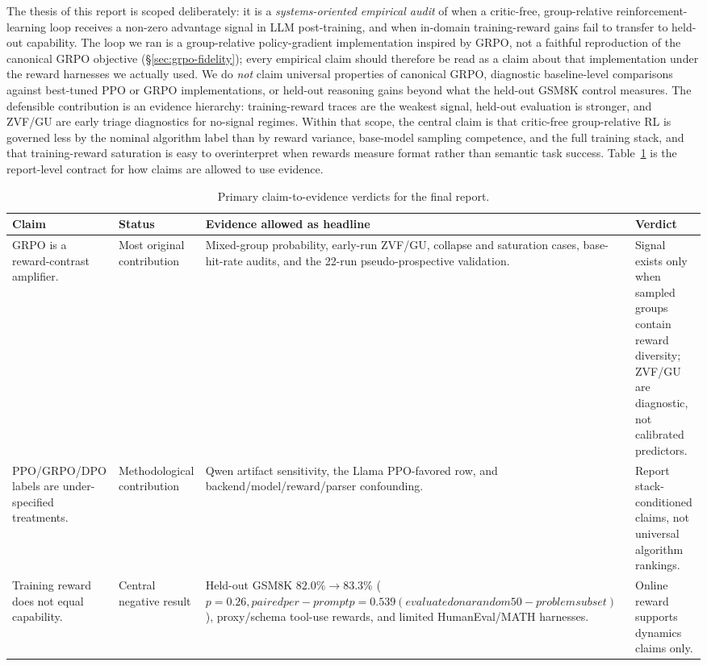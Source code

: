 \documentclass[12pt,a4paper]{report}
\begin{document}
The thesis of this report is scoped deliberately: it is a \emph{systems-oriented empirical audit} of when a critic-free, group-relative reinforcement-learning loop receives a non-zero advantage signal in LLM post-training, and when in-domain training-reward gains fail to transfer to held-out capability. The loop we ran is a group-relative policy-gradient implementation inspired by GRPO, not a faithful reproduction of the canonical GRPO objective (\S\ref{sec:grpo-fidelity}); every empirical claim should therefore be read as a claim about that implementation under the reward harnesses we actually used. We do \emph{not} claim universal properties of canonical GRPO, diagnostic baseline-level comparisons against best-tuned PPO or GRPO implementations, or held-out reasoning gains beyond what the held-out GSM8K control measures. The defensible contribution is an evidence hierarchy: training-reward traces are the weakest signal, held-out evaluation is stronger, and ZVF/GU are early triage diagnostics for no-signal regimes. Within that scope, the central claim is that critic-free group-relative RL is governed less by the nominal algorithm label than by reward variance, base-model sampling competence, and the full training stack, and that training-reward saturation is easy to overinterpret when rewards measure format rather than semantic task success. Table~\ref{tab:primary-claim-verdicts} is the report-level contract for how claims are allowed to use evidence.

\begin{table}[ht]
\centering
\caption{Primary claim-to-evidence verdicts for the final report.}
\label{tab:primary-claim-verdicts}
\small
\footnotesize
\begin{tabularx}{\textwidth}{p{3.25cm}p{2.55cm}X p{3.0cm}}
\toprule
Claim & Status & Evidence allowed as headline & Verdict\\
\midrule
GRPO is a reward-contrast amplifier. & Most original contribution & Mixed-group probability, early-run ZVF/GU, collapse and saturation cases, base-hit-rate audits, and the 22-run pseudo-prospective validation. & Signal exists only when sampled groups contain reward diversity; ZVF/GU are diagnostic, not calibrated predictors.\\
PPO/GRPO/DPO labels are under-specified treatments. & Methodological contribution & Qwen artifact sensitivity, the Llama PPO-favored row, and backend/model/reward/parser confounding. & Report stack-conditioned claims, not universal algorithm rankings.\\
Training reward does not equal capability. & Central negative result & Held-out GSM8K $82.0\%\!\to\!83.3\%$ ($p=0.26, paired per-prompt p=0.539 (evaluated on a random 50-problem subset)$), proxy/schema tool-use rewards, and limited HumanEval/MATH harnesses. & Online reward supports dynamics claims only.\\
\bottomrule
\end{tabularx}
\end{table}
\end{document}
